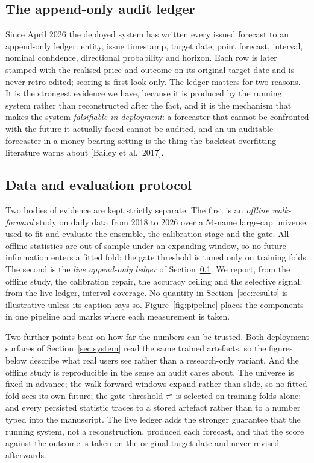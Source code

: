 \documentclass[10pt, a4paper, oneside]{article}
\theoremstyle{definition}
\theoremstyle{plain}
\begin{document}
\subsection{The append-only audit ledger}
\label{sec:ledger}
Since April 2026 the deployed system has written every issued forecast to an
append-only ledger: entity, issue timestamp, target date, point forecast, interval,
nominal confidence, directional probability and horizon. Each row is later stamped
with the realised price and outcome on its original target date and is never
retro-edited; scoring is first-look only. The ledger matters for two reasons. It is
the strongest evidence we have, because it is produced by the running system rather
than reconstructed after the fact, and it is the mechanism that makes the system
\emph{falsifiable in deployment}: a forecaster that cannot be confronted with the
future it actually faced cannot be audited, and an un-auditable forecaster in a
money-bearing setting is the thing the backtest-overfitting literature warns about
[Bailey et al.\ 2017].

\subsection{Data and evaluation protocol}
\label{sec:data}
Two bodies of evidence are kept strictly separate. The first is an \emph{offline
walk-forward} study on daily data from 2018 to 2026 over a 54-name large-cap universe,
used to fit and evaluate the ensemble, the calibration stage and the gate. All offline
statistics are out-of-sample under an expanding window, so no future information enters
a fitted fold; the gate threshold is tuned only on training folds. The second is the
\emph{live append-only ledger} of Section~\ref{sec:ledger}. We report, from the
offline study, the calibration repair, the accuracy ceiling and the selective signal;
from the live ledger, interval coverage. No quantity in Section~\ref{sec:results} is
illustrative unless its caption says so. Figure~\ref{fig:pipeline} places the
components in one pipeline and marks where each measurement is taken.

Two further points bear on how far the numbers can be trusted. Both deployment
surfaces of Section~\ref{sec:system} read the same trained artefacts, so the figures
below describe what real users see rather than a research-only variant. And the offline
study is reproducible in the sense an audit cares about. The universe is
fixed in advance; the walk-forward windows expand rather than slide, so no fitted fold
sees its own future; the gate threshold $\tau^\star$ is selected on training folds
alone; and every persisted statistic traces to a stored artefact rather than to a
number typed into the manuscript. The live ledger adds the stronger guarantee that the
running system, not a reconstruction, produced each forecast, and that the score
against the outcome is taken on the original target date and never revised afterwards.
\end{document}
